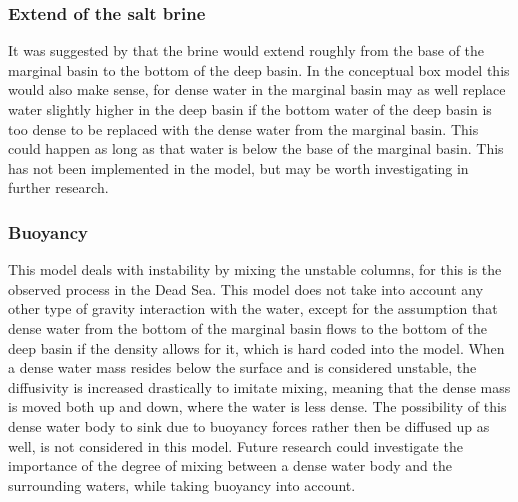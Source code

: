 \documentclass[twocolumn]{article}
\begin{document}






\subsubsection{Extend of the salt brine}
It was suggested by \cite{garcia2018geochemical} that the brine would extend roughly from the base of the marginal basin to the bottom of the deep basin. In the conceptual box model this would also make sense, for dense water in the marginal basin may as well replace water slightly higher in the deep basin if the bottom water of the deep basin is too dense to be replaced with the dense water from the marginal basin. This could happen as long as that water is below the base of the marginal basin. This has not been implemented in the model, but may be worth investigating in further research.

\subsubsection{Buoyancy}
This model deals with instability by mixing the unstable columns, for this is the observed process in the Dead Sea. This model does not take into account any other type of gravity interaction with the water, except for the assumption that dense water from the bottom of the marginal basin flows to the bottom of the deep basin if the density allows for it, which is hard coded into the model. When a dense water mass resides below the surface and is considered unstable, the diffusivity is increased drastically to imitate mixing, meaning that the dense mass is moved both up and down, where the water is less dense. The possibility of this dense water body to sink due to buoyancy forces rather then be diffused up as well, is not considered in this model. Future research could investigate the importance of the degree of mixing between a dense water body and the surrounding waters, while taking buoyancy into account. 
\end{document}
